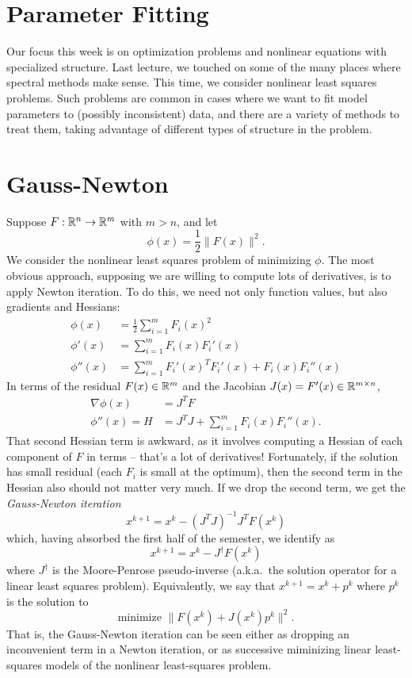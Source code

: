 \documentclass[12pt, leqno]{article} %
\begin{document}

\section*{Parameter Fitting}

Our focus this week is on optimization problems and nonlinear
equations with specialized structure.  Last lecture, we touched on
some of the many places where spectral methods make sense.  This time,
we consider nonlinear least squares problems.  Such problems are
common in cases where we want to fit model parameters to (possibly
inconsistent) data, and there are a variety of methods to treat
them, taking advantage of different types of structure in the problem.

\section*{Gauss-Newton}

Suppose $F : \mathbb{R}^n \rightarrow \mathbb{R}^m$ with $m > n$, and let
\[
  \phi(x) = \frac{1}{2} \|F(x)\|^2.
\]
We consider the nonlinear least squares problem of minimizing $\phi$.
The most obvious approach, supposing we are willing to compute lots
of derivatives, is to apply Newton iteration.  To do this, we need
not only function values, but also gradients and Hessians:
\begin{align*}
  \phi(x) &= \frac{1}{2} \sum_{i=1}^m F_i(x)^2 \\
  \phi'(x) &= \sum_{i=1}^m F_i(x) F_i'(x) \\
  \phi''(x) &= \sum_{i=1}^m F_i'(x)^T F_i'(x) + F_i(x) F_i''(x)
\end{align*}
In terms of the residual $F(x) \in \mathbb{R}^m$ and the Jacobian
$J(x) = F'(x) \in \mathbb{R}^{m \times n}$, 
\begin{align*}
  \nabla \phi(x) &= J^T F \\
  \phi''(x) = H &= J^T J + \sum_{i=1}^m F_i(x) F_i''(x).
\end{align*}
That second Hessian term is awkward, as it involves computing a
Hessian of each component of $F$ in terms -- that's a lot of
derivatives!  Fortunately, if the solution has small residual
(each $F_i$ is small at the optimum), then the second term in
the Hessian also should not matter very much.  If we 
drop the second term, we get the {\em Gauss-Newton iteration}
\[
  x^{k+1} = x^k - (J^T J)^{-1} J^T F(x^k)
\]
which, having absorbed the first half of the semester,
we identify as
\[
  x^{k+1} = x^k - J^{\dagger} F(x^k)
\]
where $J^\dagger$ is the Moore-Penrose pseudo-inverse (a.k.a.~the
solution operator for a linear least squares problem).  Equivalently,
we say that $x^{k+1} = x^k + p^k$ where $p^k$ is the solution to
\[
  \mbox{minimize } \|F(x^k) + J(x^k) p^k\|^2.
\]
That is, the Gauss-Newton iteration can be seen either as dropping an
inconvenient term in a Newton iteration, or as successive miminizing
linear least-squares models of the nonlinear least-squares problem.
\end{document}
